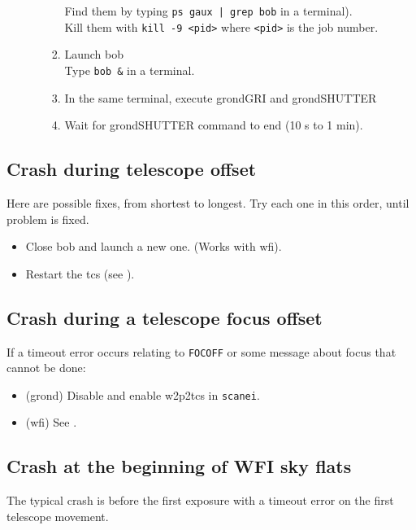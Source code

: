 \documentclass[11pt,fleqn,a4paper]{book}
\begin{document}
\begin{enumerate}
\begin{enumerate}
\begin{enumerate}
                   Find them by typing \texttt{ps gaux | grep bob} in a terminal).\\
                   Kill them with \texttt{kill -9 <pid>} where \texttt{<pid>} is the job number.
             \item Launch \gls{bob}\\  
                   Type \texttt{bob \&} in a terminal.
             \item In the same terminal, execute \gls{grondGRI} and \gls{grondSHUTTER}
             \item Wait for \gls{grondSHUTTER} command to end (10 s to 1 min).
             \end{enumerate}
  \end{enumerate}
\end{enumerate}

\subsection{Crash during telescope offset}

Here are possible fixes, from shortest to longest.  Try each one in this
order, until problem is fixed.
\begin{itemize}
  \item Close \gls{bob} and launch a new one. (Works with \gls{wfi}).
  \item Restart the \gls{tcs} (see ).
\end{itemize}

\subsection{Crash during a telescope focus offset}
If a timeout error occurs relating to \texttt{FOCOFF} or some message about
\gls{focus} that cannot be done:
\begin{itemize}
  \item (\gls{grond}) Disable and enable \gls{w2p2tcs} in \texttt{scanei}.
  \item (\gls{wfi}) See .
\end{itemize}

\subsection{Crash at the beginning of WFI sky flats}

The typical crash is before the first exposure with a timeout error on the first telescope movement.
\end{document}

